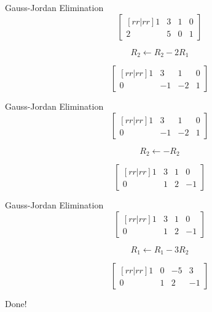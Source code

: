 \documentclass[serif,xcolor=pdftex,dvipsnames,table,hyperref={bookmarks=false,breaklinks}]{beamer}
\begin{document}
\begin{frame}[t]{Gauss-Jordan Elimination}
	$$\begin{bmatrix}[rr|rr]
    	1 & 3 & 1 & 0\\
		2 & 5 & 0 & 1
	\end{bmatrix}$$
	
	\pause
	$$R_2 \leftarrow R_2 - 2R_1$$
	
	\pause
	$$\begin{bmatrix}[rr|rr]
    	1 & 3 & 1 & 0\\
		0 & -1 & -2 & 1
	\end{bmatrix}$$
	
\end{frame}

\begin{frame}[t]{Gauss-Jordan Elimination}
	$$\begin{bmatrix}[rr|rr]
    	1 & 3 & 1 & 0\\
		0 & -1 & -2 & 1
	\end{bmatrix}$$
	
	\pause
	$$R_2 \leftarrow -R_2$$
	
	\pause
	$$\begin{bmatrix}[rr|rr]
    	1 & 3 & 1 & 0\\
		0 & 1 & 2 & -1
	\end{bmatrix}$$
	
\end{frame}

\begin{frame}[t]{Gauss-Jordan Elimination}
	$$\begin{bmatrix}[rr|rr]
    	1 & 3 & 1 & 0\\
		0 & 1 & 2 & -1
	\end{bmatrix}$$
	
	\pause
	$$R_1 \leftarrow R_1 - 3R_2$$
	
	\pause
	$$\begin{bmatrix}[rr|rr]
    	1 & 0 & -5 & 3\\
		0 & 1 & 2 & -1
	\end{bmatrix}$$
	
	\pause
	\centering
	\Huge{Done!}
\end{frame}

%
%
\end{document}
